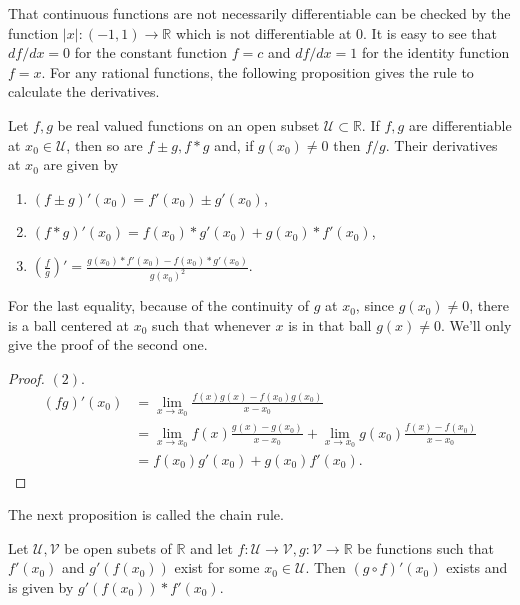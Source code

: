 That continuous functions are not necessarily differentiable can be checked by the function $\lvert
x \rvert : \left(-1,1\right) \to \mathbb{R}$ which is not differentiable at $0$. It is easy to see
that $df/dx = 0$ for the constant function $f = c$ and $df/dx = 1$ for the identity function $f =
x$. For any rational functions, the following proposition gives the rule to calculate the
derivatives.
\begin{Proposition}
    Let $f,g$ be real valued functions on an open subset $\mathcal{U} \subset \mathbb{R}$. If $f,g$
    are differentiable at $x_0 \in \mathcal{U}$, then so are $f \pm g, f*g$ and, if $g(x_0) \neq 0$
    then $f/g$. Their derivatives at $x_0$ are given by  
    \begin{enumerate}
	\item $\left(f \pm g \right)'(x_0) = f'(x_0) \pm g'(x_0)$,
	\item $\left(f*g\right)'(x_0) = f(x_0)*g'(x_0) + g(x_0)*f'(x_0)$,
	\item $\left(\frac{f}{g}\right)' = \frac{g(x_0)*f'(x_0) - f(x_0)*g'(x_0)}{g(x_0)^2}$.
    \end{enumerate}
\end{Proposition}
For the last equality, because of the continuity of $g$ at $x_0$, since $g(x_0) \neq 0$, there is a
ball centered at $x_0$ such that whenever $x$ is in that ball $g(x) \neq 0$. We'll only give the
proof of the second one.
\begin{proof}
    $(2)$. 
    \begin{displaymath}
	\begin{aligned}
	    (fg)'(x_0) & = \lim_{x \to x_0}\frac{f(x)g(x) - f(x_0)g(x_0)}{x - x_0} \\
	    & = \lim_{x \to x_0}f(x)\frac{g(x) - g(x_0)}{x - x_0} + \lim_{x \to x_0}g(x_0)\frac{f(x)
	    - f(x_0)}{x - x_0} \\
	    & = f(x_0)g'(x_0) + g(x_0)f'(x_0).
	\end{aligned}
    \end{displaymath}
\end{proof}
The next proposition is called the chain rule.
\begin{Proposition}
    Let $\mathcal{U},\mathcal{V}$ be open subets of $\mathbb{R}$ and let $f:\mathcal{U} \to
    \mathcal{V}, g: \mathcal{V} \to \mathbb{R}$ be functions such that $f'(x_0)$ and $g'(f(x_0))$
    exist for some $x_0 \in \mathcal{U}$. Then $(g\circ f)'(x_0)$ exists and is given by
    $g'(f(x_0))*f'(x_0)$.
\end{Proposition}
